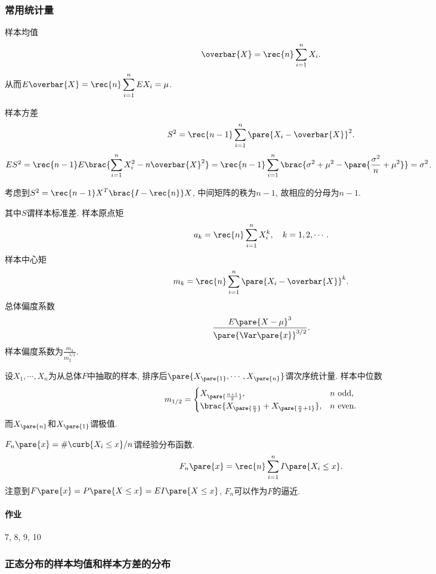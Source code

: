 \documentclass[../Statistics.tex]{subfiles}
\begin{document}
\subsubsection{常用统计量} %
\label{ssub:常用统计量}

样本均值
\[ \overbar{X} = \rec{n} \sum_{i=1}^n X_i. \]
从而$E\overbar{X} = \displaystyle \rec{n}\sum_{i=1}^n EX_i = \mu$.
\par
样本方差
\[ S^2 = \rec{n-1}\sum_{i=1}^n \pare{X_i - \overbar{X}}^2. \]
$ES^2 = \displaystyle \rec{n-1} E\brac{\sum_{i=1}^n X_i^2 - n\overbar{X}^2} = \rec{n-1} \sum_{i=1}^n \brac{\sigma^2 + \mu^2 - \pare{\frac{\sigma^2}{n} + \mu^2}} = \sigma^2$.
\begin{remark}
    考虑到$S^2 = \displaystyle \rec{n-1} X^T\brac{I - \rec{n}}X$, 中间矩阵的秩为$n-1$, 故相应的分母为$n-1$.
\end{remark}
其中$S$谓样本标准差. 样本原点矩
\[ a_k = \rec{n} \sum_{i=1}^n X_i^k,\quad k=1,2,\cdots. \]
样本中心矩
\[ m_k = \rec{n} \sum_{i=1}^n \pare{X_i - \overbar{X}}^k. \]
总体偏度系数
\[ \frac{E\pare{X-\mu}^3}{\pare{\Var\pare{x}}^{3/2}}. \]
样本偏度系数为$\displaystyle \frac{m_3}{m_2^{3/2}}$.
\par
设$X_1, \cdots, X_n$为从总体$F$中抽取的样本, 排序后$\pare{X_{\pare{1}},\cdots, X_{\pare{n}}}$谓次序统计量. 样本中位数
\[ m_{1/2} = \begin{cases}
    X_{\pare{\frac{n+1}{2}}}, & n \mathrm{\ odd}, \\
    \brac{X_{\pare{\frac{n}{2}}} + X_{\pare{\frac{n}{2}+1}}}, & n \mathrm{\ even}.
\end{cases} \]
而$X_{\pare{n}}$和$X_{\pare{1}}$谓极值.
\par
$F_n\pare{x} = \#\curb{X_i \le x}/n$谓经验分布函数.
\[ F_n\pare{x} = \rec{n}\sum_{i=1}^n I\pare{X_i \le x}. \]
注意到$F\pare{x} = P\pare{X\le x} = EI\pare{X\le x}$, $F_n$可以作为$F$的逼近.

\paragraph{作业} %
\label{par:作业}

7, 8, 9, 10



\subsubsection{正态分布的样本均值和样本方差的分布} %
\label{ssub:正态分布的样本均值和样本方差的分布}
\end{document}
